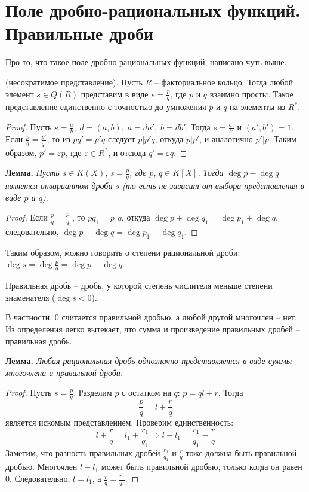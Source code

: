 \section{Поле дробно-рациональных функций. Правильные дроби}
Про то, что такое поле дробно-рациональных функций, написано чуть выше.
\begin{theorem-non}
    (несократимое представление). Пусть $R$ -- факториальное кольцо. Тогда любой элемент $s \in Q(R)$ представим в виде $s = \frac{p}{q}$, 
    где $p$ и $q$ взаимно просты. Такое представление единственно с точностью до умножения $p$ и $q$ на элементы из $R^*$.
\end{theorem-non}

\begin{proof}
    Пусть $s = \frac{a}{b}, \; d = (a, b), \; a = da', \; b = db'$. 
    Тогда $s = \frac{a'}{b'}$ и $(a', b') = 1$. 
    Если $\frac{p}{q} = \frac{p'}{q'}$, то из $pq' = p'q$ следует $p|p'q$, откуда $p|p'$, и аналогично $p'|p$. 
    Таким образом, $p' = \varepsilon p$, где $\varepsilon \in R^*$, и отсюда $q' = \varepsilon q$.
\end{proof}

\textbf{Лемма.}
\textit{Пусть $s \in K(X), \, s = \frac{p}{q}$, где $p, \, q \in K[X]$. Тогда $\deg p - \deg q$ является инвариантом дроби $s$
(то есть не зависит от выбора представления в виде $p$ и $q$).}

\begin{proof}
    Если $\frac{p}{q} = \frac{p_1}{q_1}$, то $pq_1 = p_1q$, откуда $\deg p + \deg q_1 = \deg p_1 + \deg q$, следовательно, $\deg p - \deg q = \deg p_1 - \deg q_1$.
\end{proof}

\vspace{3mm}

Таким образом, можно говорить о степени рациональной дроби: $\deg s = \deg \frac{p}{q} = \deg p - \deg q$.
\begin{conj}
    Правильная дробь -- дробь, у которой степень числителя меньше степени знаменателя ($\deg s < 0$).
\end{conj}

В частности, 0 считается правильной дробью, а любой другой многочлен -- нет. 
Из определения легко вытекает, что сумма и произведение правильных дробей -- правильная дробь.

\textbf{Лемма.}
\textit{Любая рациональная дробь однозначно представляется в виде суммы многочлена и правильной дроби.}

\begin{proof}
    Пусть $s = \frac{p}{q}$. Разделим $p$ с остатком на $q$: $p = ql + r$. 
    Тогда \[\frac{p}{q} = l + \frac{r}{q} \] является искомым представлением.
    Проверим единственность: \[ l + \frac{r}{q} = l_1 + \frac{r_1}{q_1} \Rightarrow l - l_1 = \frac{r_1}{q_1} - \frac{r}{q} \]
    Заметим, что разность правильных дробей $\frac{r_1}{q_1}$ и $\frac{r}{q}$ тоже должна быть правильной дробью.
    Многочлен $l - l_1$ может быть правильной дробью, только когда он равен 0. Следовательно, $l = l_1$, а $\frac{r}{q} = \frac{r_1}{q_1}$. 
\end{proof}